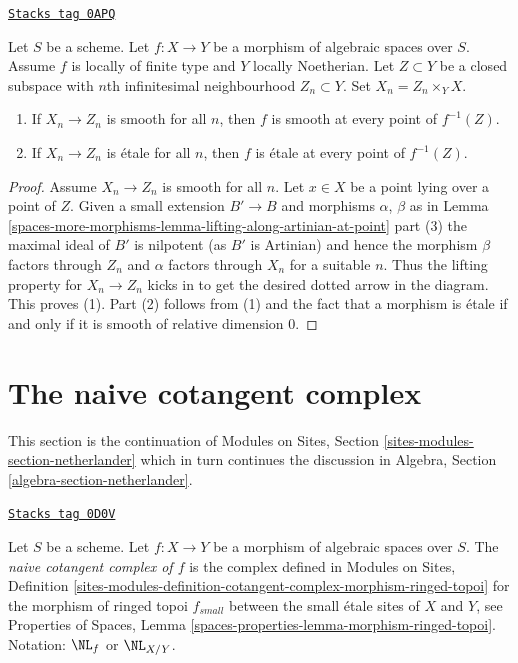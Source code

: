 \begin{lemma}
\label{spaces-more-morphisms-lemma-check-smoothness-on-infinitesimal-nbhds}
\href{https://stacks.math.columbia.edu/tag/0APQ}{\texttt{Stacks tag 0APQ}}

Let $S$ be a scheme. Let $f : X \to Y$ be a morphism of
algebraic spaces over $S$. Assume $f$ is
locally of finite type and $Y$ locally Noetherian.
Let $Z \subset Y$ be a closed subspace with $n$th infinitesimal
neighbourhood $Z_n \subset Y$. Set $X_n = Z_n \times_Y X$.
\begin{enumerate}
\item If $X_n \to Z_n$ is smooth for all $n$, then $f$
is smooth at every point of $f^{-1}(Z)$.
\item If $X_n \to Z_n$ is \'etale for all $n$, then $f$
is \'etale at every point of $f^{-1}(Z)$.
\end{enumerate}
\end{lemma}

\begin{proof}
Assume $X_n \to Z_n$ is smooth for all $n$.
Let $x \in X$ be a point lying over a point of $Z$.
Given a small extension $B' \to B$ and morphisms $\alpha$, $\beta$ as in
Lemma \ref{spaces-more-morphisms-lemma-lifting-along-artinian-at-point} part (3)
the maximal ideal of $B'$ is nilpotent (as $B'$ is Artinian)
and hence the morphism $\beta$ factors through $Z_n$ and $\alpha$ factors
through $X_n$ for a suitable $n$. Thus the lifting property for
$X_n \to Z_n$ kicks in to get the desired dotted arrow in the diagram.
This proves (1). Part (2) follows from (1) and the fact that a morphism
is \'etale if and only if it is smooth of relative dimension $0$.
\end{proof}

\section{The naive cotangent complex}
\label{spaces-more-morphisms-section-netherlander}
This section is the continuation of
Modules on Sites, Section \ref{sites-modules-section-netherlander}
which in turn continues the discussion in
Algebra, Section \ref{algebra-section-netherlander}.

\begin{definition}[Netherlander]
\label{spaces-more-morphisms-definition-netherlander}
\href{https://stacks.math.columbia.edu/tag/0D0V}{\texttt{Stacks tag 0D0V}}

Let $S$ be a scheme.
Let $f : X \to Y$ be a morphism of algebraic spaces over $S$.
The {\it naive cotangent complex of $f$}
is the complex defined in Modules on Sites, Definition
\ref{sites-modules-definition-cotangent-complex-morphism-ringed-topoi}
for the morphism of ringed topoi $f_{small}$ between the
small \'etale sites of $X$ and $Y$, see
Properties of Spaces, Lemma
\ref{spaces-properties-lemma-morphism-ringed-topoi}.
Notation: $\NL_f$ or $\NL_{X/Y}$.
\end{definition}

